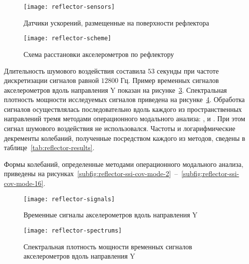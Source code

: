 \begin{figure}[!htb]
	\centerfloat
	\texttt{[image: reflector-sensors]}
	\caption{Датчики ускорений, размещенные на поверхности рефлектора} \label{fig:reflector-sensors}
\end{figure}

\begin{figure}[!htb]
	\centerfloat
	\texttt{[image: reflector-scheme]}
	\caption{Схема расстановки акселерометров по рефлектору} \label{fig:reflector-scheme}
\end{figure}

Длительность шумового воздействия составила $ 53 $ секунды при частоте дискретизации сигналов равной $ 12800 $ Гц. Пример временных сигналов акселерометров вдоль направления Y показан на рисунке~\ref{fig:reflector-signals}. Спектральная плотность мощности исследуемых сигналов приведена на рисунке~\ref{fig:reflector-spectrums}. Обработка сигналов осуществлялась последовательно вдоль каждого из пространственных направлений тремя методами операционного модального анализа: ,  и . При этом сигнал шумового воздействия не использовался. Частоты и логарифмические декременты колебаний, полученные посредством каждого из методов, сведены в таблице~\ref{tab:reflector-results}.

Формы колебаний, определенные методами операционного модального анализа, приведены на рисунках~\ref{subfig:reflector-ssi-cov-mode-2}~--~\ref{subfig:reflector-ssi-cov-mode-16}.

\begin{figure}[!htb]
	\centerfloat
	\texttt{[image: reflector-signals]}
	\caption{Временные сигналы акселерометров вдоль направления Y} \label{fig:reflector-signals}
\end{figure}

\begin{figure}[!htb]
	\centerfloat
	\texttt{[image: reflector-spectrums]}
	\caption{Спектральная плотность мощности временных сигналов акселерометров вдоль направления Y} \label{fig:reflector-spectrums}
\end{figure}


